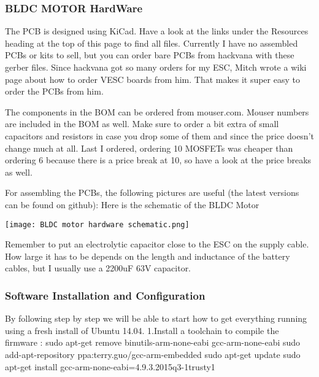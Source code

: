 \documentclass[11pt]{article}
\begin{document}
\subsubsection{BLDC  MOTOR HardWare}
\label{BLDC  MOTOR HardWare}
The PCB is designed using KiCad. Have a look at the links under the Resources heading at the top of this page to find all files. Currently I have no assembled PCBs or kits to sell, but you can order bare PCBs from hackvana with these gerber files. Since hackvana got so many orders for my ESC, Mitch wrote a wiki page about how to order VESC boards from him. That makes it super easy to order the PCBs from him.

The components in the BOM can be ordered from mouser.com. Mouser numbers are included in the BOM as well. Make sure to order a bit extra of small capacitors and resistors in case you drop some of them and since the price doesn’t change much at all. Last I ordered, ordering 10 MOSFETs was cheaper than ordering 6 because there is a price break at 10, so have a look at the price breaks as well.

For assembling the PCBs, the following pictures are useful (the latest versions can be found on github):\newline
Here is the schematic of the BLDC Motor \newline
\begin {center}
\texttt{[image: BLDC motor hardware schematic.png]}\newline

\end{center}

Remember to put an electrolytic capacitor close to the ESC on the supply cable. How large it has to be depends on the length and inductance of the battery cables, but I usually use a 2200uF 63V capacitor. \newline

\subsubsection{Software Installation and Configuration}
\label{Software Installation and Configuration}
By following step by step we will be able to start how to get everything running using a fresh install of Ubuntu 14.04. \newline
1.Install a toolchain to compile the firmware :\newline
sudo apt-get remove binutils-arm-none-eabi gcc-arm-none-eabi\newline
sudo add-apt-repository ppa:terry.guo/gcc-arm-embedded\newline
sudo apt-get update\newline
sudo apt-get install gcc-arm-none-eabi=4.9.3.2015q3-1trusty1\newline
\end{document}
